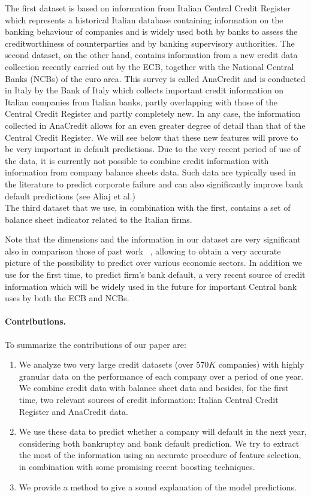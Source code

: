 The first dataset is based on information from Italian Central Credit Register which represents a historical Italian database containing information on the banking behaviour of companies and is widely used both by banks to assess the creditworthiness of counterparties and by banking supervisory authorities.
The second dataset, on the other hand, contains information from a new credit data collection recently carried out by the ECB, together with the National Central Banks (NCBs) of the euro area. This survey is called AnaCredit and is conducted in Italy by the Bank of Italy which collects important credit information on Italian companies from Italian banks, partly overlapping with those of the Central Credit Register and partly completely new. 
In any case, the information collected in AnaCredit allows for an even greater degree of detail than that of the Central Credit Register.
We will see below that these new features will prove to be very important in default predictions.
Due to the very recent period of use of the data, it is currently not possible to combine credit information with information from company balance sheets data. Such data are typically used in the literature to predict corporate failure and can also significantly improve bank default predictions (see Aliaj et al.)\\
The third dataset that we use, in combination with the first, contains a set of balance sheet indicator related to the Italian firms.


Note that the dimensions and the information in our dataset are very
significant also in comparison those of past work ~\cite{altman-bankruptcy-17,Atiya-15}, allowing to obtain a very accurate
picture of the possibility to predict over various economic sectors.
In addition we use for the first time, to predict firm's bank default, a very recent source of credit information which will be widely used in the future for important Central bank uses by both the ECB and NCBs.




\paragraph{Contributions.} To summarize the contributions of our paper are:
\begin{enumerate}
\item We analyze two very large credit datasets (over $570K$ companies) with highly granular
data on the performance of each company over a period of one year. We combine credit data with balance sheet data and besides, for the first time, two relevant sources of credit information: Italian Central Credit Register and AnaCredit data.
\item We use these data to predict whether a company will default in the
next year, considering both bankruptcy and bank default prediction. We try to extract the most of the information using an accurate procedure of feature selection, in combination with some promising recent boosting techniques.
\item We provide a method to give a sound explanation of the model predictions.
\end{enumerate}

